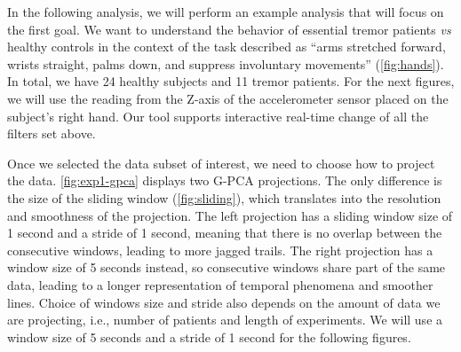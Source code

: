 In the following analysis, we will perform an example analysis that will focus on the first goal. We want to understand the behavior of essential tremor patients \textit{vs} healthy controls in the context of the task described as ``arms stretched forward, wrists straight, palms down, and suppress involuntary movements'' (\cref{fig:hands}). In total, we have 24 healthy subjects and 11 tremor patients.
For the next figures, we will use the reading from the Z-axis of the accelerometer sensor placed on the subject's right hand. Our tool supports interactive real-time change of all the filters set above.

Once we selected the data subset of interest, we need to choose how to project the data. \cref{fig:exp1-gpca} displays two G-PCA projections. The only difference is the size of the sliding window (\cref{fig:sliding}), which translates into the resolution and smoothness of the projection. The left projection has a sliding window size of 1 second and a stride of 1 second, meaning that there is no overlap between the consecutive windows, leading to more jagged trails. The right projection has a window size of 5 seconds instead, so consecutive windows share part of the same data, leading to a longer representation of temporal phenomena and smoother lines. Choice of windows size and stride also depends on the amount of data we are projecting, i.e., number of patients and length of experiments. We will use a window size of 5 seconds and a stride of 1 second for the following figures. 

